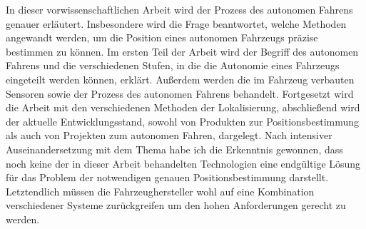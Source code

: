 
In dieser vorwissenschaftlichen Arbeit wird der Prozess des autonomen Fahrens genauer erläutert. Insbesondere wird die Frage beantwortet, welche Methoden angewandt werden, um die Position eines autonomen Fahrzeugs präzise bestimmen zu können.
\bigskip
Im ersten Teil der Arbeit wird der Begriff des autonomen Fahrens und die verschiedenen Stufen, in die die Autonomie eines Fahrzeugs eingeteilt werden können, erklärt. Außerdem werden die im Fahrzeug verbauten Sensoren sowie der Prozess des autonomen Fahrens behandelt. Fortgesetzt wird die Arbeit mit den verschiedenen Methoden der Lokalisierung, abschließend wird der aktuelle Entwicklungsstand, sowohl von Produkten zur Positionsbestimmung als auch von Projekten zum autonomen Fahren, dargelegt.
\bigskip
Nach intensiver Auseinandersetzung mit dem Thema habe ich die Erkenntnis gewonnen, dass noch keine der in dieser Arbeit behandelten Technologien eine endgültige Lösung für das Problem der notwendigen genauen Positionsbestimmung darstellt. Letztendlich müssen die Fahrzeughersteller wohl auf eine Kombination verschiedener Systeme zurückgreifen um den hohen Anforderungen gerecht zu werden.
